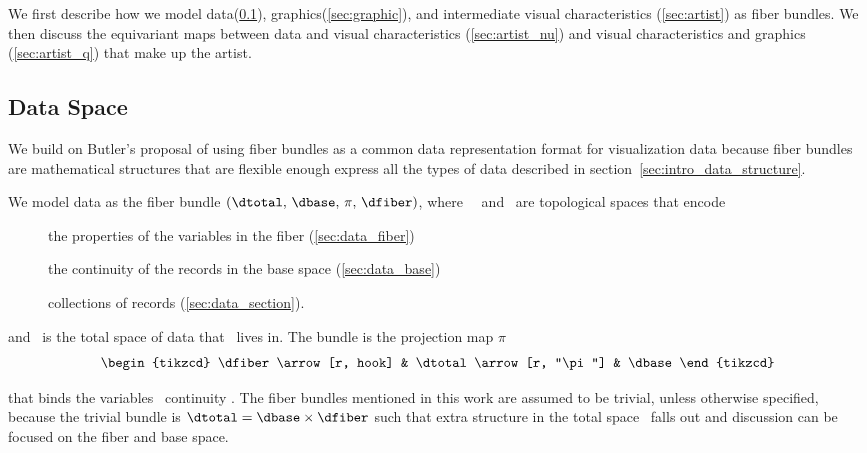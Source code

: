 \documentclass[../main.tex]{subfiles}
\begin{document}
We first describe how we model data(\ref{sec:data}), graphics(\ref{sec:graphic}), and intermediate visual characteristics (\ref{sec:artist}) as fiber bundles. We then discuss the equivariant maps between data and visual characteristics (\ref{sec:artist_nu}) and visual characteristics and graphics (\ref{sec:artist_q}) that make up the artist.

\subsection{Data Space \dtotal}
\label{sec:data}
We build on Butler's proposal of using fiber bundles as a common data representation format for visualization data\cite{butlerVectorBundleClassesForm1992, butlerVisualizationModelBased1989} because fiber bundles are mathematical structures that are flexible enough express all the types of data described in section~\ref{sec:intro_data_structure}.

We model data as the fiber bundle $(\dtotal,\,\dbase,\,\pi ,\,\dfiber)$, where \dtotal\, \dfiber\, and \dbase\ are topological spaces that encode 
\begin{description}
\item[\dfiber] the properties of the variables in the fiber (\ref{sec:data_fiber})
\item[\dbase] the continuity of the records in the base space (\ref{sec:data_base})
\item[\dsection] collections of records (\ref{sec:data_section}). 
\end{description}

and \dtotal\ is the total space of data that \dfiber\ lives in. The bundle is the projection map $\pi$
\begin{equation}
    \label{eq:fiber_bundle}
    \begin{tikzcd}
        \dfiber \arrow[r, hook] & \dtotal \arrow[r, "\pi"] & \dbase
    \end{tikzcd}
\end{equation}

that binds the variables \dfiber\ continuity \dbase. The fiber bundles mentioned in this work are assumed to be trivial\cite{spanier1989algebraic,LocallyTrivialFibre}, unless otherwise specified, because the trivial bundle is $\dtotal=\dbase\times \dfiber$ such that extra structure in the total space \dtotal\ falls out and discussion can be focused on the fiber and base space. 
\end{document}
